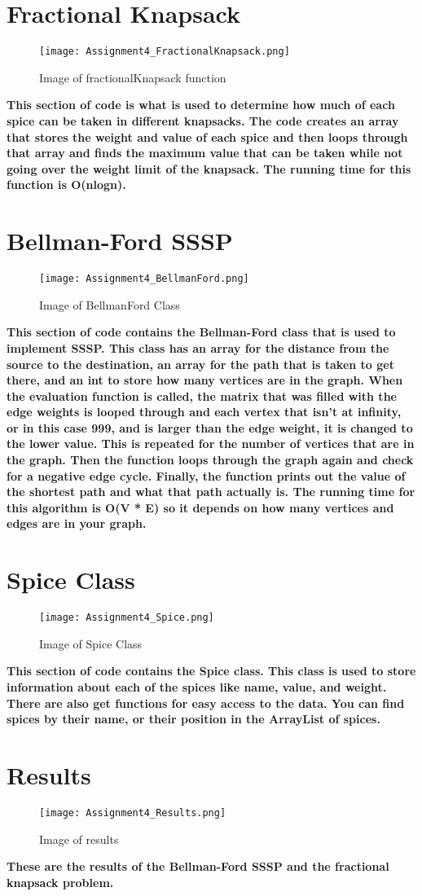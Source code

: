 \documentclass{article}
\begin{document}
\section{Fractional Knapsack}
\begin{figure}[h]
    \centering
    \texttt{[image: Assignment4\_FractionalKnapsack.png]}
    \caption{Image of fractionalKnapsack function}
    \label{fig:fractionalKnapsackFunction}
\end{figure}
\textbf{This section of code is what is used to determine how much of each spice can be taken in different knapsacks. The code creates an array that stores the weight and value of each spice and then loops through that array and finds the maximum value that can be taken while not going over the weight limit of the knapsack. The running time for this function is O(nlogn).}
\newpage

\section{Bellman-Ford SSSP}
\begin{figure}[h]
    \centering
    \texttt{[image: Assignment4\_BellmanFord.png]}
    \caption{Image of BellmanFord Class}
    \label{fig:BellmanFordClass}
\end{figure}
\textbf{This section of code contains the Bellman-Ford class that is used to implement SSSP. This class has an array for the distance from the source to the destination, an array for the path that is taken to get there, and an int to store how many vertices are in the graph. When the evaluation function is called, the matrix that was filled with the edge weights is looped through and each vertex that isn't at infinity, or in this case 999, and is larger than the edge weight, it is changed to the lower value. This is repeated for the number of vertices that are in the graph. Then the function loops through the graph again and check for a negative edge cycle. Finally, the function prints out the value of the shortest path and what that path actually is. The running time for this algorithm is O(V * E) so it depends on how many vertices and edges are in your graph.}
\newpage

\section{Spice Class}
\begin{figure}[h]
    \centering
    \texttt{[image: Assignment4\_Spice.png]}
    \caption{Image of Spice Class}
    \label{fig:spiceClass}
\end{figure}
\textbf{This section of code contains the Spice class. This class is used to store information about each of the spices like name, value, and weight. There are also get functions for easy access to the data. You can find spices by their name, or their position in the ArrayList of spices.}
\newpage

\section{Results}
\begin{figure}[h]
    \centering
    \texttt{[image: Assignment4\_Results.png]}
    \caption{Image of results}
    \label{fig:resuts}
\end{figure}
\textbf{These are the results of the Bellman-Ford SSSP and the fractional knapsack problem.}
\end{document}
